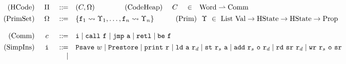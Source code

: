 \begin{figure*}[!t]
    \centering
    \vspace{-2em}
    \small
    \[
        \begin{array}{rcclcrccl}
            \TYPE{(HCode)} & \ \HMd \ & \define & (\code, \hprimset) & & 
            \qquad\,
            \TYPE{(CodeHeap)} & \ \code \ & \in & \TYPE{Word} \rightharpoonup \TYPE{Comm} 
            \\
            \\[-8pt]
            \TYPE{(PrimSet)} & \hprimset & \define & 
            \multicolumn{6}{l}
                {
                    \{ \lab{1} \rightsquigarrow \hprim_1, \dots, \lab{n} \rightsquigarrow \hprim_n \}
                    \qquad\quad
                    \TYPE{(Prim)} \ \ \hprim \ \in \ 
                    \TYPE{List} \ \TYPE{Val} \rightarrow \TYPE{HState} \rightarrow 
                    \TYPE{HState} \rightarrow \TYPE{Prop}            
                }  \\
            \\
            \TYPE{(Comm)} & \comm & \define & 
            \multicolumn{6}{l}
            {
                \simplins{} \sepline \call{} \ \lab{} 
                \sepline \jmp{} \ \aexp \sepline \retl \sepline \be{} \ \lab{}
            }  
            \\
            \\[-8pt]
            \TYPE{(SimpIns)} & \simplins{} & \define & 
            \multicolumn{6}{l}
            {
                \Psave \ \word \sepline \Prestore  \sepline \cprint \ \reg{} \sepline 
                \ld{} \ \aexp \ \reg{d} \sepline 
                \st{} \ \reg{s} \ \aexp \sepline \cadd{} \ \reg{s} \ \oexp \ \reg{d}
                \sepline
                \rd \ \sr \ \reg{d} \sepline \cwr \ \reg{s} \ \oexp \ \sr 
            } 
            \\
            & & \quad | & 

\end{array}\]
\end{figure*}
